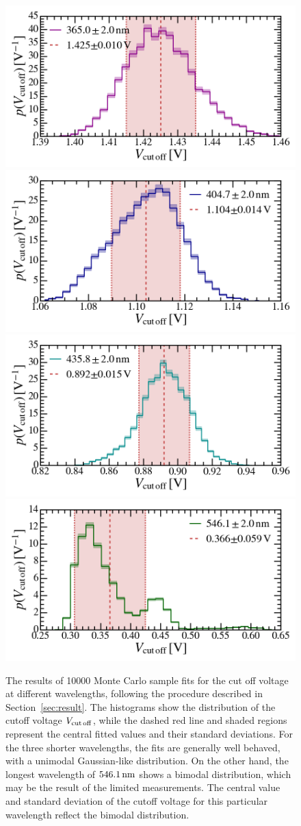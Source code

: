\documentclass[aps,twocolumn,secnumarabic,balancelastpage,amsmath,amssymb,nofootinbib,floatfix]{revtex4-1}
\newcommand{\nm}{\,{\rm nm}}
\begin{document}
\begin{figure}
    \centering
    \includegraphics[width=0.49 \textwidth]{Figures/V_cutoff_365nm.png}
    \includegraphics[width=0.49 \textwidth]{Figures/V_cutoff_405nm.png}
    \includegraphics[width=0.49 \textwidth]{Figures/V_cutoff_436nm.png}
    \includegraphics[width=0.49 \textwidth]{Figures/V_cutoff_546nm.png}
    \caption{The results of 10000 Monte Carlo sample fits for the cut off voltage at different wavelengths, following the procedure described in Section~\ref{sec:result}. The histograms show the distribution of the cutoff voltage $V_{\rm{cut\,off}}$, while the dashed red line and shaded regions represent the central fitted values and their standard deviations. For the three shorter wavelengths, the fits are generally well behaved, with a unimodal Gaussian-like distribution. On the other hand, the longest wavelength of $546.1\nm$ shows a bimodal distribution, which may be the result of the limited measurements. The central value and standard deviation of the cutoff voltage for this particular wavelength reflect the bimodal distribution.}
    \label{fig:MC_fitting}
\end{figure}
\end{document}
